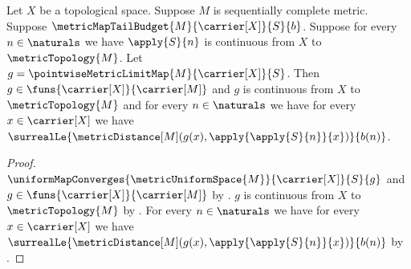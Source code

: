 \begin{corollary}\label{continuous_metric_map_limit_from_tail_budget}
    Let $X$ be a topological space.
    Suppose $M$ is sequentially complete metric.
    Suppose $\metricMapTailBudget{M}{\carrier[X]}{S}{b}$.
    Suppose for every $n\in\naturals$ we have
        $\apply{S}{n}$ is continuous from $X$ to $\metricTopology{M}$.
    Let $g=\pointwiseMetricLimitMap{M}{\carrier[X]}{S}$.
    Then $g\in\funs{\carrier[X]}{\carrier[M]}$ and
        $g$ is continuous from $X$ to $\metricTopology{M}$ and
        for every $n\in\naturals$ we have for every
            $x\in\carrier[X]$ we have
            $\surrealLe{\metricDistance[M]
                (g(x),\apply{\apply{S}{n}}{x})}{b(n)}$.
\end{corollary}
\begin{proof}
    $\uniformMapConverges
        {\metricUniformSpace{M}}{\carrier[X]}{S}{g}$ and
        $g\in\funs{\carrier[X]}{\carrier[M]}$
        by .
    $g$ is continuous from $X$ to $\metricTopology{M}$
        by .
    For every $n\in\naturals$ we have for every
        $x\in\carrier[X]$ we have
        $\surrealLe{\metricDistance[M]
            (g(x),\apply{\apply{S}{n}}{x})}{b(n)}$
        by .
\end{proof}
